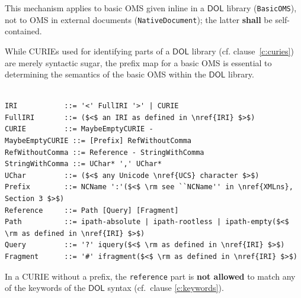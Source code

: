\documentclass[10pt, a4paper]{isov2}
\makeatletter
\newcommand*{\cf}{cf.\@\xspace}
\newcommand*{\eg}{e.g.\@\xspace}
\newcommand*\CommentAuthor{}
\renewcommand*\CommentAuthor{#1}}
\newcommand*\CommentDate{}
\renewcommand*\CommentDate{#1}}
\newcommand*\CommentId{}
\renewcommand*\CommentId{#1}}
\newcommand*\CommentType{}
\renewcommand*\CommentType{#1}}
\newcommand*{\SetCommentColorByType}[1]{%
\edef\localType{{#1}}%
\expandafter\ifstrequal\localType{q-aut}{\colorlet{CommentColor}{red}}{%
\expandafter\ifstrequal\localType{q-all}{\colorlet{CommentColor}{orange}}{%
\expandafter\ifstrequal\localType{todo}{\colorlet{CommentColor}{orange}}{%
\expandafter\ifstrequal\localType{fyi}{\colorlet{CommentColor}{lightgray}}{%
\colorlet{CommentColor}{yellow}}}}}}
\newcommand*{\SetCommentPrefixByType}[1]{%
\edef\localType{{#1}}%
\expandafter\@ifmtarg\localType{%
\edef\CommentPrefix{}%
}{%
\caseupper[q]{#1}%
\edef\CommentPrefix{\thestring: }%
}}
\newcommand*{\initComment}[1]{%
\setkeys{Comment}{#1}%
\SetCommentColorByType{\CommentType}%
\relax%
\SetCommentPrefixByType{\CommentType}%
\relax%
}
\newcommand*{\todonote}[2][]{%
\initComment{#1}%
\pdfcomment[author=\CommentAuthor,color=CommentColor,date=\CommentDate,id=\CommentId]{%
\CommentPrefix
#2}}
\renewcommand*{\todonote}[2][]{%
\initComment{#1}%
\ednote{\CommentPrefix #2}}
\newcommand*{\syntax}[1]{\texttt{#1}}
\newcommand*{\notallowed}{\textbf{not allowed}\xspace}
\newcommand*{\shall}{\textbf{shall}\xspace}
\newcommand*{\DOL}{\ensuremath{\mathsf{DOL}}\xspace}
\renewcommand{\clauserefname}{clause}
\renewcommand{\noterefname}{note}
\renewcommand{\cref}[1]{\clauserefname~\ref{#1}}
\renewcommand{\nref}[1]{\noterefname~\ref{#1}}
\renewcommand{\nref}[1]{\ref{nref-#1}}
\makeatother
\begin{document}
This mechanism applies to basic OMS given inline in a \DOL library (\syntax{BasicOMS}), not to OMS in external documents (\syntax{NativeDocument}); the latter \shall be self-contained.

While CURIEs used for identifying parts of a \DOL library (\cf \cref{c:curies}) are merely syntactic 
sugar, the prefix map for a basic OMS is essential to determining the semantics of the basic OMS 
within the \DOL library. 



\label{c:curie-syntax}

\vspace{-1.4em}
\begin{lstlisting}[language=ebnf,escapeinside={()}]

IRI           ::= '<' FullIRI '>' | CURIE
FullIRI       ::= ($<$ an IRI as defined in \nref{IRI} $>$) 
CURIE         ::= MaybeEmptyCURIE -
MaybeEmptyCURIE ::= [Prefix] RefWithoutComma
RefWithoutComma ::= Reference - StringWithComma
StringWithComma ::= UChar* ',' UChar*
UChar         ::= ($<$ any Unicode \nref{UCS} character $>$) 
Prefix        ::= NCName ':'($<$ \rm see ``NCName'' in \nref{XMLns}, Section 3 $>$)
Reference     ::= Path [Query] [Fragment]
Path          ::= ipath-absolute | ipath-rootless | ipath-empty($<$ \rm as defined in \nref{IRI} $>$)
Query         ::= '?' iquery($<$ \rm as defined in \nref{IRI} $>$)
Fragment      ::= '#' ifragment($<$ \rm as defined in \nref{IRI} $>$)
\end{lstlisting}


In a CURIE without a prefix, the \syntax{reference} part is \notallowed to match any of the keywords of the \DOL syntax (cf.\ clause \ref{c:keywords}).

\medspace








\end{document}
